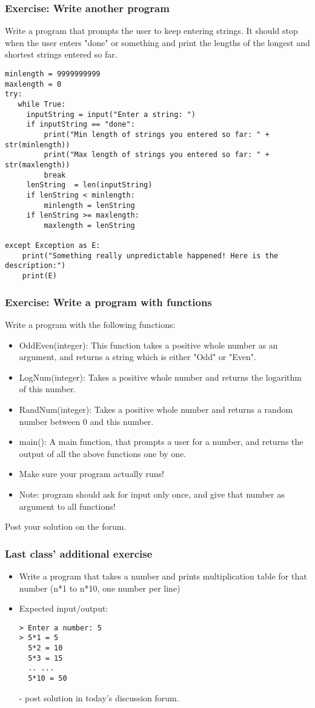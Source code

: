 \documentclass{beamer}
\begin{document}
\begin{frame}[fragile]
\frametitle{Exercise: Write another program}
Write a program that prompts the user to keep entering strings. It should stop when the user enters "done" or something and print the lengths of the longest and shortest strings entered so far. \pause \scriptsize
\begin{verbatim}
minlength = 9999999999
maxlength = 0
try:
   while True:
     inputString = input("Enter a string: ")
     if inputString == "done":
         print("Min length of strings you entered so far: " + str(minlength))
         print("Max length of strings you entered so far: " + str(maxlength))
         break
     lenString  = len(inputString)
     if lenString < minlength:
         minlength = lenString
     if lenString >= maxlength:
         maxlength = lenString

except Exception as E:
    print("Something really unpredictable happened! Here is the description:")
    print(E)
\end{verbatim}
\end{frame}

\begin{frame}%
\frametitle{Exercise: Write a program with functions}
Write a program with the following functions:
\begin{itemize}
\item OddEven(integer): This function takes a positive whole number as an argument, and returns a string which is either "Odd" or "Even".
\item LogNum(integer): Takes a positive whole number and returns the logarithm of this number. 
\item RandNum(integer): Takes a positive whole number and returns a random number between 0 and this number.
\item main(): A main function, that prompts a user for a number, and returns the output of all the above functions one by one. 
\item Make sure your program actually runs!
\item Note: program should ask for input only once, and give that number as argument to all functions!
\end{itemize}
Post your solution on the forum.
\end{frame}

\begin{frame}[fragile]
\frametitle{Last class' additional exercise}
\begin{itemize}
\item Write a program that takes a number and prints multiplication table for that number (n*1 to n*10, one number per line)
\item Expected input/output:
\begin{verbatim}
> Enter a number: 5
> 5*1 = 5
  5*2 = 10
  5*3 = 15
  .. ... 
  5*10 = 50
\end{verbatim}
- post solution in today's discussion forum. 
\end{itemize}
\end{frame}
\end{document}
